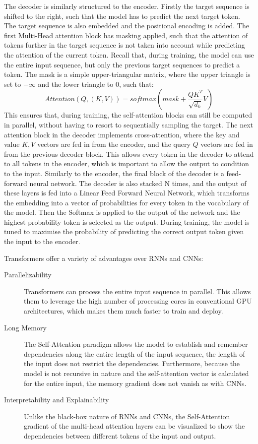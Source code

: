 The decoder is similarly structured to the encoder. Firstly the target sequence is shifted to the right, such that the model has to predict the next target token. The target sequence is also embedded and the positional encoding is added. The first Multi-Head attention block has masking applied, such that the attention of tokens further in the target sequence is not taken into account while predicting the attention of the current token. Recall that, during training, the model can use the entire input sequence, but only the previous target sequences to predict a token. The mask is a simple upper-triangular matrix, where the upper triangle is set to \(-\infty\) and the lower triangle to \(0\), such that: \[Attention(Q,(K,V)) = softmax(mask + \frac{QK^T}{\sqrt{d_k}}V)\]
This ensures that, during training, the self-attention blocks can still be computed in parallel, without having to resort to sequentially sampling the target.
The next attention block in the decoder implements cross-attention, where the key and value \(K, V\) vectors are fed in from the encoder, and the query \(Q\) vectors are fed in from the previous decoder block. This allows every token in the decoder to attend to all tokens in the encoder, which is important to allow the output to condition to the input. Similarly to the encoder, the final block of the decoder is a feed-forward neural network. The decoder is also stacked N times, and the output of these layers is fed into a Linear Feed Forward Neural Network, which transforms the embedding into a vector of probabilities for every token in the vocabulary of the model. Then the Softmax is applied to the output of the network and the highest probability token is selected as the output. During training, the model is tuned to maximise the probability of predicting the correct output token given the input to the encoder.

Transformers offer a variety of advantages over RNNs and CNNs:
\begin{description}
    \item[Parallelizability] Transformers can process the entire input sequence in parallel. This allows them to leverage the high number of processing cores in conventional GPU architectures, which makes them much faster to train and deploy.
    \item[Long Memory] The Self-Attention paradigm allows the model to establish and remember dependencies along the entire length of the input sequence, the length of the input does not restrict the dependencies. Furthermore, because the model is not recursive in nature and the self-attention vector is calculated for the entire input, the memory gradient does not vanish as with CNNs.
    \item[Interpretability and Explainability] Unlike the black-box nature of RNNs and CNNs, the Self-Attention gradient of the multi-head attention layers can be visualized to show the dependencies between different tokens of the input and output.
\end{description}

